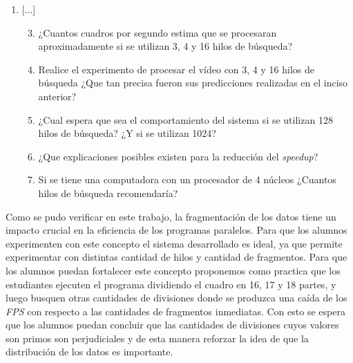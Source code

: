 \begin{enumerate}

	\item{[...]

\begin{enumerate}

	\setcounter{enumii}{2}

	\item{¿Cuantos cuadros por segundo estima que se procesaran
		aproximadamente si se utilizan 3, 4 y 16 hilos de búsqueda?}

	\item{Realice el experimento de procesar el vídeo con 3, 4 y 16 hilos de
		búsqueda ¿Que tan precisa fueron sus predicciones realizadas en
		el inciso anterior?}

	\item{¿Cual espera que sea el comportamiento del sistema si se utilizan
		128 hilos de búsqueda? ¿Y si se utilizan 1024?}

	\item{¿Que explicaciones posibles existen para la reducción del
		\emph{speedup}?}

	\item{Si se tiene una computadora con un procesador de 4 núcleos
		¿Cuantos hilos de búsqueda recomendaría?}

\end{enumerate}}

\end{enumerate}

Como se pudo verificar en este trabajo, la fragmentación de los datos tiene un
impacto crucial en la eficiencia de los programas paralelos. Para que los
alumnos experimenten con este concepto el sistema desarrollado es ideal, ya que
permite experimentar con distintas cantidad de hilos y cantidad de fragmentos.
Para que los alumnos puedan fortalecer este concepto proponemos como practica
que los estudiantes ejecuten el programa dividiendo el cuadro en 16, 17 y 18
partes, y luego busquen otras cantidades de divisiones donde se produzca una
caída de los \emph{FPS} con respecto a las cantidades de fragmentos inmediatas.
Con esto se espera que los alumnos puedan concluir que las cantidades de
divisiones cuyos valores son primos son perjudiciales y de esta manera
reforzar la idea de que la distribución de los datos es importante.

